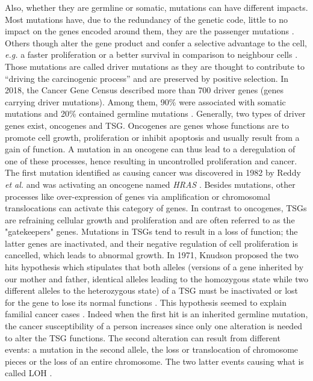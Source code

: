 Also, whether they are germline or somatic, mutations can have different impacts. Most mutations have, due to the redundancy of the genetic code, little to no impact on the genes encoded around them, they are the passenger mutations \cite{Vogelstein2013}. Others though alter the gene product and confer a selective advantage to the cell, \textit{e.g.} a faster proliferation or a better survival in comparison to neighbour cells \cite{Stratton2009}. Those mutations are called driver mutations as they are thought to contribute to “driving the carcinogenic process” and are preserved by positive selection. In 2018, the Cancer Gene Census described more than 700 driver genes (genes carrying driver mutations). Among them, 90\% were associated with somatic mutations and 20\% contained germline mutations \cite{Sondka2018,CancerGeneCensus}. Generally, two types of driver genes exist, oncogenes and \gls{TSG}. 
Oncogenes are genes whose functions are to promote cell growth, proliferation or inhibit apoptosis and usually result from a gain of function. A mutation in an oncogene can thus lead to a deregulation of one of these processes, hence resulting in uncontrolled proliferation and cancer. The first mutation identified as causing cancer was discovered in 1982 by Reddy \textit{et al.} and was activating an oncogene named \textit{HRAS} \cite{Reddy1982}. Besides mutations, other processes like over-expression of genes via amplification or chromosomal translocations can activate this category of genes. 
In contrast to oncogenes, \gls{TSG}s are refraining cellular growth and proliferation and are often referred to as the "gatekeepers" genes. Mutations in \gls{TSG}s tend to result in a loss of function; the latter genes are inactivated, and their negative regulation of cell proliferation is cancelled, which leads to abnormal growth. 
In 1971, Knudson proposed the two hits hypothesis which stipulates that both alleles (versions of a gene inherited by our mother and father, identical alleles leading to the homozygous state while two different alleles to the heterozygous state) of a \gls{TSG} must be inactivated or lost for the gene to lose its normal functions \cite{Knudson1971}. This hypothesis seemed to explain familial cancer cases \cite{Martinez-Jimenez2020}. Indeed when the first hit is an inherited germline mutation, the cancer susceptibility of a person increases since only one alteration is needed to alter the \gls{TSG} functions. The second alteration can result from different events: a mutation in the second allele, the loss or translocation of chromosome pieces or the loss of an entire chromosome. The two latter events causing what is called \gls{LOH} \cite{Eggert2011}.

